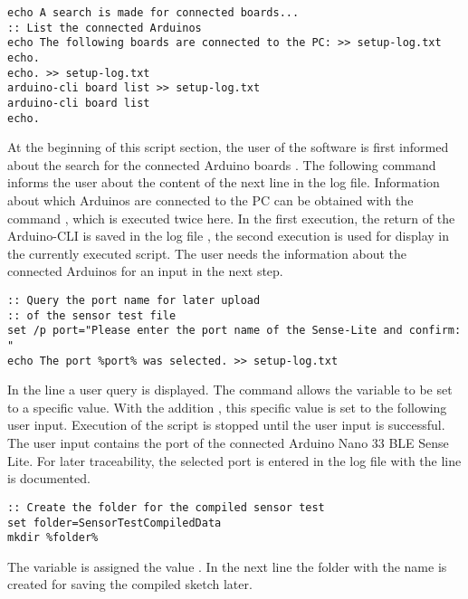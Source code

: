 \begin{lstlisting}
echo A search is made for connected boards...
:: List the connected Arduinos
echo The following boards are connected to the PC: >> setup-log.txt
echo.
echo. >> setup-log.txt
arduino-cli board list >> setup-log.txt
arduino-cli board list
echo.
\end{lstlisting}

At the beginning of this script section, the user of the software is first informed about the search for the connected Arduino boards . The following command  informs the user about the content of the next line in the log file. Information about which Arduinos are connected to the PC can be obtained with the command , which is executed twice here. In the first execution, the return of the Arduino-CLI is saved in the log file , the second execution is used for display in the currently executed script. The user needs the information about the connected Arduinos for an input in the next step.

\begin{lstlisting}
:: Query the port name for later upload 
:: of the sensor test file
set /p port="Please enter the port name of the Sense-Lite and confirm: "
echo The port %port% was selected. >> setup-log.txt
\end{lstlisting}

In the line  a user query is displayed. The command  allows the variable  to be set to a specific value. With the addition , this specific value is set to the following user input. Execution of the script is stopped until the user input is successful. The user input contains the port of the connected Arduino Nano 33 BLE Sense Lite. For later traceability, the selected port is entered in the log file with the line  is documented. 

\begin{lstlisting}
:: Create the folder for the compiled sensor test
set folder=SensorTestCompiledData
mkdir %folder%
\end{lstlisting}
The variable  is assigned the value . In the next line  the folder with the name  is created for saving the compiled sketch later.

